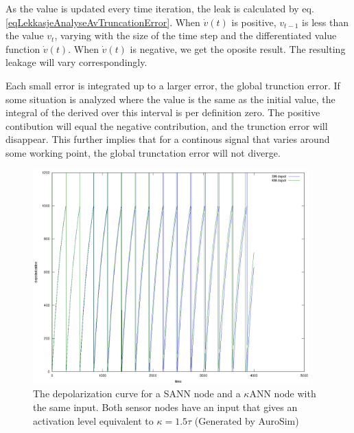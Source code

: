 As the value is updated every time iteration, the leak is calculated by eq. \ref{eqLekkasjeAnalyseAvTruncationError}.
When $\dot{v}(t)$ is positive, $v_{t-1}$ is less than the value $v_t$, varying with the size of the time step and the differentiated value function $\dot{v}(t)$.
When $\dot{v}(t)$ is negative, we get the oposite result.
The resulting leakage will vary correspondingly.

Each small error is integrated up to a larger error, the global trunction error. 
If some situation is analyzed where the value is the same as the initial value, the integral of the derived over this interval is per definition zero.
The positive contibution will equal the negative contribution, and the trunction error will disappear.
This further implies that for a continous signal that varies around some working point, the global trunctation error will not diverge. 

\begin{figure}[hbt!]
	\centering
		\includegraphics[width=0.95\textwidth]{eps_comparison_between_KN_and_SN_ConstKappa.eps}
	\caption{The depolarization curve for a SANN node and a $\kappa$ANN node with the same input. Both sensor nodes have an input that gives an activation level equivalent to $\kappa = 1.5 \tau$ 
			(Generated by AuroSim)} %
	\label{figComparisonBetweenSsensorAndKsensorDepolCurveCONStActivityLevel}
\end{figure}


